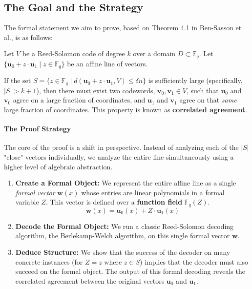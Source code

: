 \documentclass{article}
\begin{document}
\subsection{The Goal and the Strategy}
The formal statement we aim to prove, based on Theorem 4.1 in Ben-Sasson et al.\cite{ben2023proximity}, is as follows:

\begin{tcolorbox}[breakable, title={Theorem to Prove (Correlated Agreement)}]
Let $V$ be a Reed-Solomon code of degree $k$ over a domain $D \subset \mathbb{F}_q$. Let $\{\mathbf{u}_0 + z \cdot \mathbf{u}_1 \mid z \in \mathbb{F}_q\}$ be an affine line of vectors.

If the set $S = \{z \in \mathbb{F}_q \mid d(\mathbf{u}_0 + z \cdot \mathbf{u}_1, V) \le \delta n\}$ is sufficiently large (specifically, $|S| > k+1$), then there must exist two codewords, $\mathbf{v}_0, \mathbf{v}_1 \in V$, such that $\mathbf{u}_0$ and $\mathbf{v}_0$ agree on a large fraction of coordinates, and $\mathbf{u}_1$ and $\mathbf{v}_1$ agree on that \textit{same} large fraction of coordinates. This property is known as \textbf{correlated agreement}.
\end{tcolorbox}

\paragraph{The Proof Strategy}
The core of the proof is a shift in perspective. Instead of analyzing each of the $|S|$ "close" vectors individually, we analyze the entire line simultaneously using a higher level of algebraic abstraction.
\begin{enumerate}
    \item \textbf{Create a Formal Object:} We represent the entire affine line as a single \textit{formal vector} $\mathbf{w}(x)$ whose entries are linear polynomials in a formal variable $Z$. This vector is defined over a \textbf{function field} $\mathbb{F}_q(Z)$.
    \[ \mathbf{w}(x) = \mathbf{u}_0(x) + Z \cdot \mathbf{u}_1(x) \]
    \item \textbf{Decode the Formal Object:} We run a classic Reed-Solomon decoding algorithm, the Berlekamp-Welch algorithm, on this single formal vector $\mathbf{w}$.
    \item \textbf{Deduce Structure:} We show that the success of the decoder on many concrete instances (for $Z=z$ where $z \in S$) implies that the decoder must also succeed on the formal object. The output of this formal decoding reveals the correlated agreement between the original vectors $\mathbf{u}_0$ and $\mathbf{u}_1$.
\end{enumerate}
\end{document}
